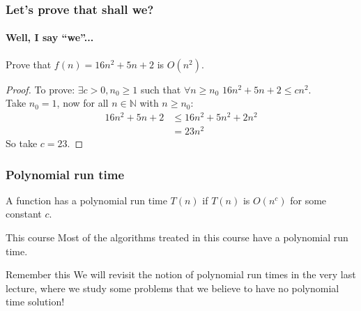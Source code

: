 \begin{frame}
	\frametitle{Let's prove that shall we?}
	\framesubtitle{Well, I say ``we''...}

	\begin{questionblock}{}
		Prove that $f(n) = 16n^2 + 5n + 2$ is $O(n^2)$.
	\end{questionblock}
	\pause
	\begin{proof}
		To prove: $\exists c > 0, n_0 \geq 1$ such that $\forall n \geq n_0$ $16n^2 + 5n + 2 \leq cn^2$.\\
		\pause
		Take $n_0 = 1$, now for all $n \in \mathbb{N}$ with $n \geq n_0$:
		\begin{align*}
			16n^2 + 5n + 2 &\leq 16n^2 + 5n^2 + 2n^2 \\
										 &= 23n^2
		\end{align*}
		So take $c=23$.
	\end{proof}
\end{frame}

\begin{frame}
	\frametitle{Polynomial run time}
	
	\begin{definition}
		A function has a polynomial run time $T(n)$ if $T(n)$ is $O(n^c)$ for some constant $c$.	
	\end{definition}
	\pause
	\begin{exampleblock}{This course}
		Most of the algorithms treated in this course have a polynomial run time.
	\end{exampleblock}	

	\pause
	\begin{alertblock}{Remember this}
		We will revisit the notion of polynomial run times in the very last lecture, where we study some problems that
		we believe to have no polynomial time solution!
	\end{alertblock}	
\end{frame}

